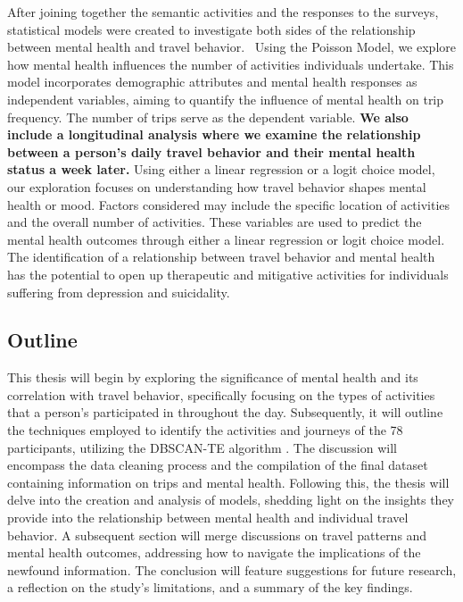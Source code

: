 \documentclass[
  letterpaper,
  authoryear]{elsarticle}
\begin{document}
After joining together the semantic activities and the responses to the
surveys, statistical models were created to investigate both sides of
the relationship between mental health and travel behavior.~ Using the
Poisson Model, we explore how mental health influences the number of
activities individuals undertake. This model incorporates demographic
attributes and mental health responses as independent variables, aiming
to quantify the influence of mental health on trip frequency. The number
of trips serve as the dependent variable. \textbf{We also include a
longitudinal analysis where we examine the relationship between a
person's daily travel behavior and their mental health status a week
later.} Using either a linear regression or a logit choice model, our
exploration focuses on understanding how travel behavior shapes mental
health or mood. Factors considered may include the specific location of
activities and the overall number of activities. These variables are
used to predict the mental health outcomes through either a linear
regression or logit choice model. The identification of a relationship
between travel behavior and mental health has the potential to open up
therapeutic and mitigative activities for individuals suffering from
depression and suicidality.

\hypertarget{outline}{%
\subsection{Outline}\label{outline}}

This thesis will begin by exploring the significance of mental health
and its correlation with travel behavior, specifically focusing on the
types of activities that a person's participated in throughout the day.
Subsequently, it will outline the techniques employed to identify the
activities and journeys of the 78 participants, utilizing the DBSCAN-TE
algorithm \citep{riches2022} . The discussion will encompass the data
cleaning process and the compilation of the final dataset containing
information on trips and mental health. Following this, the thesis will
delve into the creation and analysis of models, shedding light on the
insights they provide into the relationship between mental health and
individual travel behavior. A subsequent section will merge discussions
on travel patterns and mental health outcomes, addressing how to
navigate the implications of the newfound information. The conclusion
will feature suggestions for future research, a reflection on the
study's limitations, and a summary of the key findings.
\end{document}
